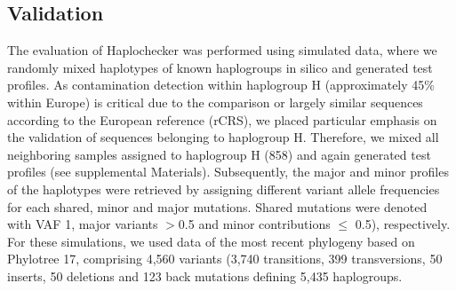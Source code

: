 \subsection{Validation}
The evaluation of Haplochecker  was performed using simulated data, where we randomly mixed haplotypes of known haplogroups in silico and generated test profiles. As contamination detection within haplogroup H (approximately 45\% within Europe) is critical due to the comparison or largely similar sequences according to the European reference (rCRS), we placed particular emphasis on the validation of sequences belonging to haplogroup H. Therefore, we mixed all neighboring samples assigned to haplogroup H (858) and again generated test profiles (see supplemental Materials). Subsequently, the major and minor profiles of the haplotypes were retrieved by assigning different variant allele frequencies for each shared, minor and major mutations. Shared mutations were denoted with VAF 1, major variants $>$0.5 and minor contributions $\leq$ 0.5), respectively. For these simulations, we used data of the most recent phylogeny based on Phylotree 17, comprising 4,560 variants (3,740 transitions, 399 transversions, 50 inserts, 50 deletions and 123 back mutations defining 5,435 haplogroups. 
